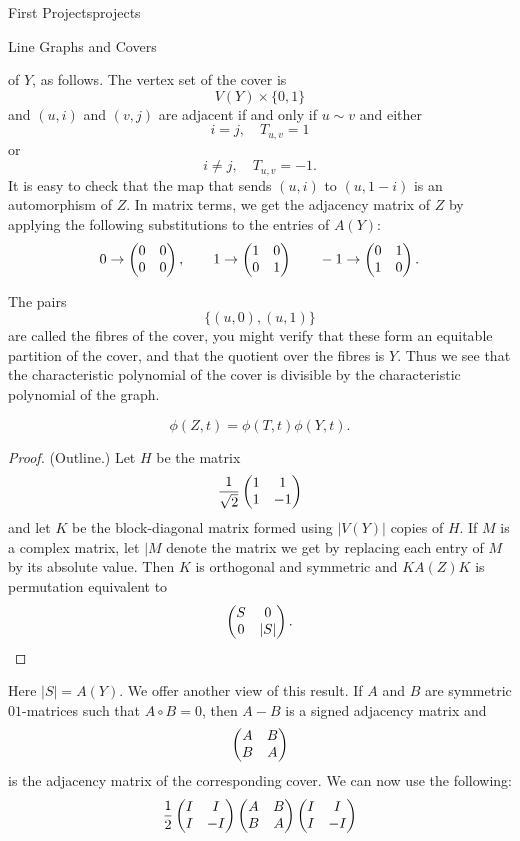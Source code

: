 \begin{chap}{First Projects}{projects}
\begin{sect}{Line Graphs and Covers}
\begin{para}
of $Y$, as follows. The vertex set of the cover is
\[
    V(Y) \times \{0,1\}
\]
and $(u,i)$ and $(v,j)$ are adjacent if and only if $u\sim v$ and either
\[
    i=j,\quad T_{u,v}=1
\]
or
\[
    i\ne j,\quad T_{u,v}=-1.
\]
It is easy to check that the map that sends $(u,i)$ to $(u,1-i)$ is an automorphism
of $Z$. In matrix terms, we get the adjacency matrix of $Z$ by applying
the following substitutions to the entries of $A(Y)$:
\[
    0\to\begin{pmatrix} 0&0\\0&0 \end{pmatrix},\qquad 1\to\begin{pmatrix} 1&0\\0&1 \end{pmatrix}
        \qquad -1\to\begin{pmatrix} 0&1\\1&0 \end{pmatrix}.
\]
\end{para}
%
\begin{para}
The pairs 
\[
    \{(u,0),(u,1)\}
\]
are called the fibres of the cover, you might verify that these form an equitable
partition of the cover, and that the quotient over the fibres is $Y$. Thus
we see that the characteristic polynomial of the cover is divisible
by the characteristic polynomial of the graph.
\end{para}
%
\begin{para}
%
\begin{lemma}
\begin{statement}
\[
        \phi(Z,t) =\phi(T,t)\phi(Y,t).
\]
\end{statement}    
\begin{proof}
(Outline.) Let $H$ be the matrix
\[
    \frac{1}{\sqrt{2}} \begin{pmatrix} 1&1\\1&-1 \end{pmatrix}
\]
and let $K$ be the block-diagonal matrix formed using $|V(Y)|$ copies of $H$.
If $M$ is a complex matrix, let $|M$ denote the matrix we get by replacing each entry
of $M$ by its absolute value.
Then $K$ is orthogonal and symmetric and $KA(Z)K$ is permutation equivalent to 
\[
    \begin{pmatrix} S&0\\0&|S| \end{pmatrix}.
\]
\end{proof}
\end{lemma}
\end{para}
%
\begin{para}
Here $|S|=A(Y)$. We offer another view of this result.
If $A$ and $B$ are symmetric $01$-matrices such that $A\circ B=0$,
then $A-B$ is a signed adjacency matrix and
\[
    \begin{pmatrix} A&B\\B&A \end{pmatrix}
\]
is the adjacency matrix of the corresponding cover.
We can now use the following:
\[
    \frac12\begin{pmatrix} I&I\\I&-I \end{pmatrix}\begin{pmatrix} A&B\\B&A \end{pmatrix}\begin{pmatrix} I&I\\I&-I \end{pmatrix}
\]
\end{para}
\end{sect}
\end{chap}
